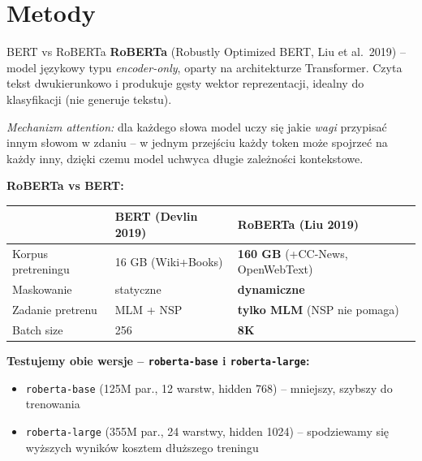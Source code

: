 \documentclass[10pt]{beamer}
\begin{document}
\section{Metody}

\begin{frame}{BERT vs RoBERTa}
  \small
  \textbf{RoBERTa} (Robustly Optimized BERT, Liu et al.\ 2019) -- model
  językowy typu \emph{encoder-only}, oparty na architekturze Transformer.
  Czyta tekst dwukierunkowo i produkuje gęsty wektor reprezentacji,
  idealny do klasyfikacji (nie generuje tekstu).

  \emph{Mechanizm attention:} dla każdego słowa model uczy się jakie
  \emph{wagi} przypisać innym słowom w zdaniu -- w jednym przejściu
  każdy token może spojrzeć na każdy inny, dzięki czemu model uchwyca
  długie zależności kontekstowe.

  \vspace{0.3em}
  \textbf{RoBERTa vs BERT:}
  \begin{center}
  \begin{tabular}{lll}
    \toprule
     & \textbf{BERT (Devlin 2019)} & \textbf{RoBERTa (Liu 2019)} \\
    \midrule
    Korpus pretreningu & 16 GB (Wiki+Books) & \textbf{160 GB} (+CC-News, OpenWebText) \\
    Maskowanie         & statyczne          & \textbf{dynamiczne} \\
    Zadanie pretrenu   & MLM + NSP          & \textbf{tylko MLM} (NSP nie pomaga) \\
    Batch size         & 256                & \textbf{8K} \\
    \bottomrule
  \end{tabular}
  \end{center}

  \vspace{0.3em}
  \scriptsize
  \textbf{Testujemy obie wersje -- \texttt{roberta-base} i \texttt{roberta-large}:}
  \begin{itemize}
    \item \texttt{roberta-base} (125M par., 12 warstw, hidden 768) -- mniejszy,
          szybszy do trenowania
    \item \texttt{roberta-large} (355M par., 24 warstwy, hidden 1024) --
          spodziewamy się wyższych wyników kosztem dłuższego treningu
  \end{itemize}
\end{frame}
\end{document}
